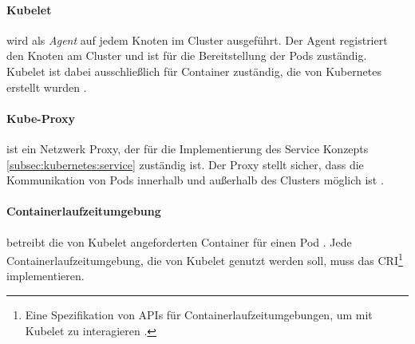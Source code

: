 \paragraph{Kubelet} wird als \emph{Agent} auf jedem Knoten im Cluster ausgeführt. 
Der Agent registriert den Knoten am Cluster und ist für die Bereitstellung der Pods zuständig.
Kubelet ist dabei ausschließlich für Container zuständig, die von Kubernetes erstellt wurden \cite{kubernetesComponents}.

\paragraph{Kube-Proxy} ist ein Netzwerk Proxy, der für die Implementierung des Service Konzepts \ref{subsec:kubernetes:service}
zuständig ist. 
Der Proxy stellt sicher, dass die Kommunikation von Pods innerhalb und außerhalb des Clusters möglich ist \cite{kubernetesComponents}.

\paragraph{Containerlaufzeitumgebung} betreibt die von Kubelet angeforderten Container für einen Pod \cite{kubernetesComponents}. 
Jede Containerlaufzeitumgebung, die von Kubelet genutzt werden soll, muss das 
\ac{CRI}\footnote{Eine Spezifikation von APIs für Containerlaufzeitumgebungen, um mit Kubelet zu interagieren \cite{cri}.} implementieren.
